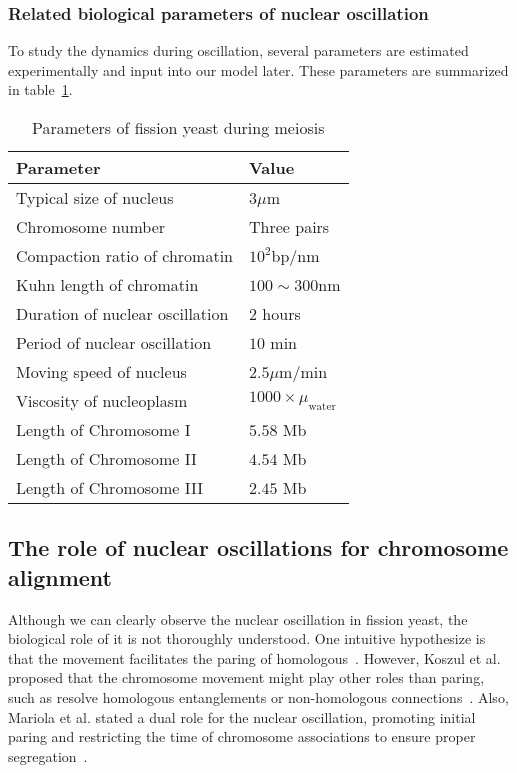 \subsubsection{Related biological parameters of nuclear oscillation}
To study the dynamics during oscillation, several parameters are estimated experimentally and input into our model later. These parameters are summarized in table~\ref{tab:parameters}.

\begin{table}[htpb]
    \centering
    \caption{Parameters of fission yeast during meiosis}
    \label{tab:parameters}
    \begin{tabular}{l|l}
        \hline
        \textbf{Parameter} & \textbf{Value} \\
        \hline
        Typical size of nucleus          &  $3\mu$m \\
        Chromosome number                &  Three pairs \\
        Compaction ratio of chromatin    &  $10^2$bp/nm \\
        Kuhn length of chromatin         &  $100\sim300$nm  \\
        Duration of nuclear oscillation  &  $2$ hours  \\
        Period of nuclear oscillation    &  $10$ min  \\
        Moving speed of nucleus          &  $2.5\mu$m/min \\
        Viscosity of nucleoplasm         &  $1000\times \mu_{\text{water}}$ \\
        Length of Chromosome I           & $5.58$ Mb  \\
        Length of Chromosome II          & $4.54$ Mb  \\
        Length of Chromosome III         & $2.45$ Mb  \\
        \hline
    \end{tabular}
\end{table}


\subsection{The role of nuclear oscillations for chromosome alignment}
\label{sub:the_role_of_nuclear_oscillations_for_chromosome_alignment}


Although we can clearly observe the nuclear oscillation in fission yeast, the biological role of it is not thoroughly understood. One intuitive hypothesize is that the movement facilitates the paring of homologous~\cite{Ding2004}. However, Koszul et al. proposed that the chromosome movement might play other roles than paring, such as resolve homologous entanglements or non-homologous connections~\cite{Koszul2009a}. Also, Mariola et al. stated a dual role for the nuclear oscillation, promoting initial paring and restricting the time of chromosome associations to ensure proper segregation~\cite{Chacon2016}. 

